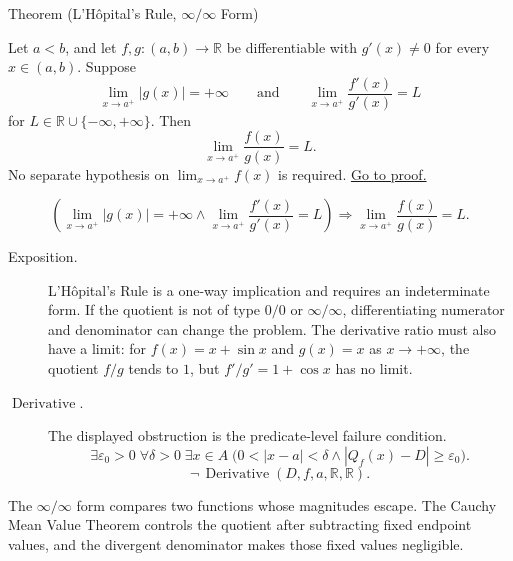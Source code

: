 \begin{theorembox}{Theorem (L'H\^{o}pital's Rule, \(\infty/\infty\) Form)}
\begin{theorem}
\label{thm:lhopital-infinity-over-infinity}
Let \(a<b\), and let \(f,g:(a,b)\to\mathbb{R}\) be differentiable with \(g'(x)\neq 0\) for every \(x\in(a,b)\). Suppose
\[
  \lim_{x\to a^+}|g(x)|=+\infty
  \qquad\text{and}\qquad
  \lim_{x\to a^+}\frac{f'(x)}{g'(x)}=L
\]
for \(L\in\mathbb{R}\cup\{-\infty,+\infty\}\). Then
\[
  \lim_{x\to a^+}\frac{f(x)}{g(x)}=L.
\]
No separate hypothesis on \(\lim_{x\to a^+}f(x)\) is required.
\hyperref[prf:lhopital-infinity-over-infinity]{Go to proof.}
\end{theorem}
\end{theorembox}

\begin{remark*}
\[
  \left(
  \lim_{x\to a^+}|g(x)|=+\infty
  \land
  \lim_{x\to a^+}\frac{f'(x)}{g'(x)}=L
  \right)
  \Longrightarrow
  \lim_{x\to a^+}\frac{f(x)}{g(x)}=L.
\]
\end{remark*}

\begin{remark*}
\begin{description}
  \item[Exposition.]
L'H\^{o}pital's Rule is a one-way implication and requires an indeterminate form. If the quotient is not of type \(0/0\) or \(\infty/\infty\), differentiating numerator and denominator can change the problem. The derivative ratio must also have a limit: for \(f(x)=x+\sin x\) and \(g(x)=x\) as \(x\to+\infty\), the quotient \(f/g\) tends to \(1\), but \(f'/g'=1+\cos x\) has no limit.


  \item[\(\operatorname{Derivative}.\)]
  The displayed obstruction is the predicate-level failure condition.
  \[
  \exists\varepsilon_0>0\;\forall\delta>0\;\exists x\in A\;\bigl(0<|x-a|<\delta\land |Q_f(x)-D|\ge\varepsilon_0\bigr).
  \]
  \[
  \neg\,\operatorname{Derivative}(D,f,a,\mathbb{R},\mathbb{R}).
  \]
\end{description}
\end{remark*}

\begin{remark*}[Interpretation]
The \(\infty/\infty\) form compares two functions whose magnitudes escape. The Cauchy Mean Value Theorem controls the quotient after subtracting fixed endpoint values, and the divergent denominator makes those fixed values negligible.
\end{remark*}

